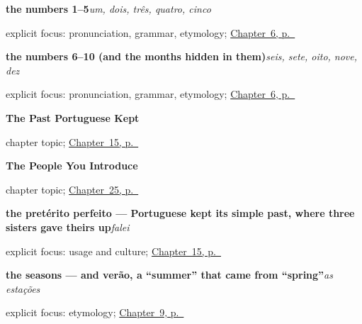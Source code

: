 \noindent\begin{minipage}[t]{\linewidth}
\raggedright
\textbf{the numbers 1–5}\enspace\emph{um, dois, três, quatro, cinco}\par
\footnotesize explicit focus: pronunciation, grammar, etymology; \hyperref[ch:pt-numbers-one-to-ten]{Chapter~6, p.~\pageref*{ch:pt-numbers-one-to-ten}}
\end{minipage}\par\smallskip

\noindent\begin{minipage}[t]{\linewidth}
\raggedright
\textbf{the numbers 6–10 (and the months hidden in them)}\enspace\emph{seis, sete, oito, nove, dez}\par
\footnotesize explicit focus: pronunciation, grammar, etymology; \hyperref[ch:pt-numbers-one-to-ten]{Chapter~6, p.~\pageref*{ch:pt-numbers-one-to-ten}}
\end{minipage}\par\smallskip

\noindent\begin{minipage}[t]{\linewidth}
\raggedright
\textbf{The Past Portuguese Kept}\par
\footnotesize chapter topic; \hyperref[ch:pt-past-portuguese-kept]{Chapter~15, p.~\pageref*{ch:pt-past-portuguese-kept}}
\end{minipage}\par\smallskip

\noindent\begin{minipage}[t]{\linewidth}
\raggedright
\textbf{The People You Introduce}\par
\footnotesize chapter topic; \hyperref[ch:pt-people-you-introduce]{Chapter~25, p.~\pageref*{ch:pt-people-you-introduce}}
\end{minipage}\par\smallskip

\noindent\begin{minipage}[t]{\linewidth}
\raggedright
\textbf{the pretérito perfeito — Portuguese kept its simple past, where three sisters gave theirs up}\enspace\emph{falei}\par
\footnotesize explicit focus: usage and culture; \hyperref[ch:pt-past-portuguese-kept]{Chapter~15, p.~\pageref*{ch:pt-past-portuguese-kept}}
\end{minipage}\par\smallskip

\noindent\begin{minipage}[t]{\linewidth}
\raggedright
\textbf{the seasons — and verão, a \textquotedblleft{}summer\textquotedblright{} that came from \textquotedblleft{}spring\textquotedblright{}}\enspace\emph{as estações}\par
\footnotesize explicit focus: etymology; \hyperref[ch:pt-months-and-seasons]{Chapter~9, p.~\pageref*{ch:pt-months-and-seasons}}
\end{minipage}\par\smallskip

